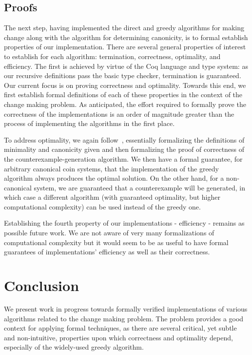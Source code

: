 \documentclass{acm_proc_article-sp}
\begin{document}
\subsection{Proofs}

The next step, having implemented the direct and greedy algorithms for making change along with the algorithm for determining canonicity, is to formal establish properties of our implementation. There are several general properties of interest to establish for each algorithm: termination, correctness, optimality, and efficiency. The first is achieved by virtue of the Coq language and type system: as our recursive definitions pass the basic type checker, termination is guaranteed. Our current focus is on proving correctness and optimality. Towards this end, we first establish formal definitions of each of these properties in the context of the change making problem. As anticipated, the effort required to formally prove the correctness of the implementations  is  an order of magnitude greater than the process of implementing the algorithms in the first place. 

To address optimality, we again follow~\cite{pearson94}, essentially formalizing the definitions of minimality and canonicity given and then formalizing the proof of correctness of the counterexample-generation algorithm. We then have a formal guarantee, for arbitrary canonical coin systems, that the implementation of the greedy algorithm always produces the optimal solution. On the other hand, for a non-canonical system, we are guaranteed that a counterexample will be generated, in which case a different algorithm (with guaranteed optimality, but higher computational complexity) can be used instead of the greedy one.

Establishing the fourth property of our implementations - efficiency - remains as possible future work. We are not aware of very many formalizations of computational complexity but it would seem to be as useful to have formal guarantees of  implementations' efficiency as well as their correctness.


\section{Conclusion}

We present work in progress towards formally verified implementations of various algorithms related to the change making problem. The problem provides a good context for applying formal techniques, as there are several critical, yet subtle and non-intuitive, properties upon which correctness and optimality depend, especially of the widely-used greedy algorithm.




\end{document}
